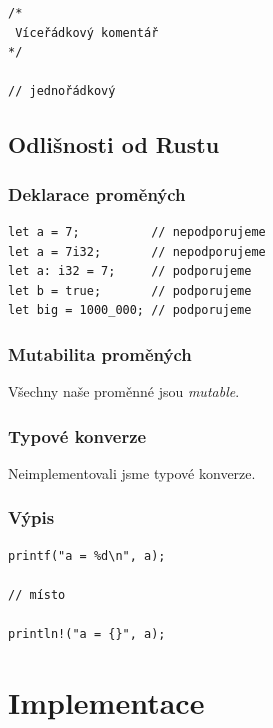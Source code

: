 \documentclass[12pt,a4paper]{article}
\begin{document}
\begin{verbatim}
/*
 Víceřádkový komentář
*/

// jednořádkový
\end{verbatim}

\subsection{Odlišnosti od Rustu}

\subsubsection*{Deklarace proměných}

\begin{verbatim}
let a = 7;          // nepodporujeme
let a = 7i32;       // nepodporujeme
let a: i32 = 7;     // podporujeme
let b = true;       // podporujeme
let big = 1000_000; // podporujeme
\end{verbatim}

\subsubsection*{Mutabilita proměných}

Všechny naše proměnné jsou \textsl{mutable}.

\subsubsection*{Typové konverze}

Neimplementovali jsme typové konverze.

\subsubsection*{Výpis}

\begin{verbatim}
printf("a = %d\n", a);

// místo

println!("a = {}", a);
\end{verbatim}


\section{Implementace}
\end{document}
